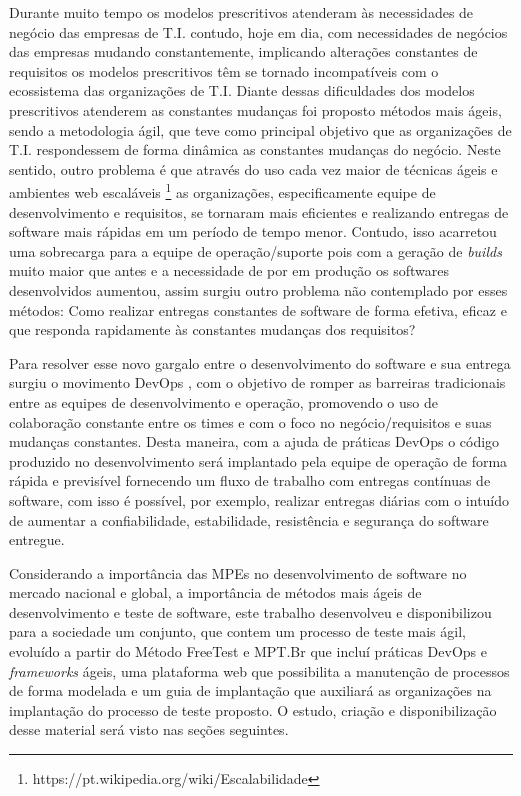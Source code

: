 Durante muito tempo os modelos prescritivos atenderam às necessidades de negócio das empresas de T.I. contudo, hoje em dia, com necessidades de negócios das empresas mudando constantemente, implicando alterações constantes de requisitos os modelos prescritivos têm se tornado incompatíveis com o ecossistema das organizações de T.I. Diante dessas dificuldades dos modelos prescritivos atenderem as constantes mudanças foi proposto métodos mais ágeis, sendo a metodologia ágil, que teve como principal objetivo que as organizações de T.I. respondessem de forma dinâmica as constantes mudanças do negócio. Neste sentido, outro problema é que através do uso cada vez maior de técnicas ágeis e ambientes web escaláveis \footnote{https://pt.wikipedia.org/wiki/Escalabilidade} as organizações, especificamente equipe de desenvolvimento e requisitos, se tornaram mais eficientes e realizando entregas de software mais rápidas em um período de tempo menor. Contudo, isso acarretou uma sobrecarga para a equipe de operação/suporte pois com a geração de \textit{builds} muito maior que antes e a necessidade de por em produção os softwares desenvolvidos aumentou, assim surgiu outro problema não contemplado por esses métodos: Como realizar entregas constantes de software de forma efetiva, eficaz e que responda rapidamente às constantes mudanças dos requisitos?

Para resolver esse novo gargalo entre o desenvolvimento do software e sua entrega surgiu o movimento DevOps \cite{Debois2008}, com o objetivo de romper as barreiras tradicionais entre as equipes de desenvolvimento e operação, promovendo o uso de colaboração constante entre os times e com o foco no negócio/requisitos e suas mudanças constantes. Desta maneira, com a ajuda de práticas DevOps o código produzido no desenvolvimento será implantado pela equipe de operação de forma rápida e previsível fornecendo um fluxo de trabalho com entregas contínuas de software, com isso é possível, por exemplo, realizar entregas diárias com o intuído de aumentar a confiabilidade, estabilidade, resistência e segurança do software entregue.


Considerando a importância das MPEs no desenvolvimento de software no mercado nacional e global, a importância de métodos mais ágeis de desenvolvimento e teste de software, este trabalho desenvolveu e disponibilizou para a sociedade um conjunto, que contem um processo de teste mais ágil, evoluído a partir do Método FreeTest \cite{Camilo-junior2012} e MPT.Br \cite{GuiaMPTbr} que incluí práticas DevOps e \textit{frameworks} ágeis, uma plataforma web que possibilita a manutenção de processos de forma modelada e um guia de implantação que auxiliará as organizações na implantação do processo de teste proposto. O estudo, criação e disponibilização desse material será visto nas seções seguintes.

